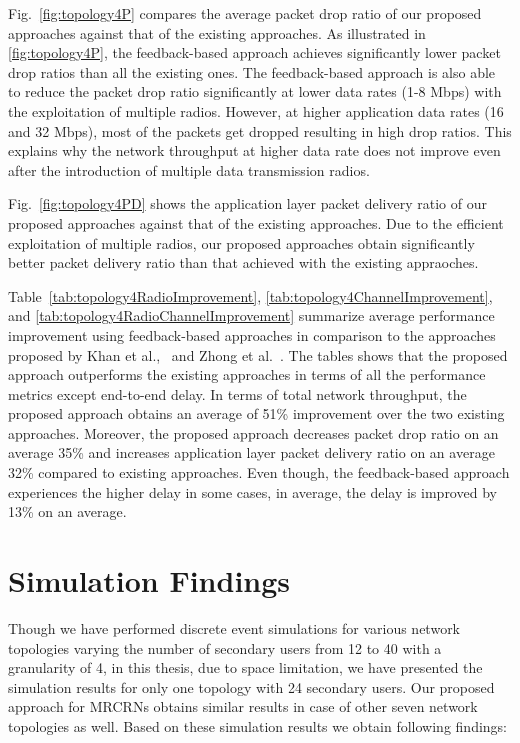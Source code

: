 Fig.~\ref{fig:topology4P} compares the average packet drop ratio of our proposed approaches against that of the existing approaches.  As illustrated in \cref{fig:topology4P}, the feedback-based approach achieves significantly lower packet drop ratios than all the existing ones. The feedback-based approach is also able to reduce the packet drop ratio significantly at lower data rates (1-8 Mbps) with the exploitation of multiple radios. However, at higher application data rates (16 and 32 Mbps), most of the packets get dropped resulting in high drop ratios. This explains why the network throughput at higher data rate does not improve even after the introduction of multiple data transmission radios.

Fig.~\ref{fig:topology4PD} shows the application layer packet delivery ratio of our proposed approaches against that of the existing approaches. Due to the efficient exploitation of multiple radios, our proposed approaches obtain significantly better packet delivery ratio than that achieved with the existing appraoches.

Table~\ref{tab:topology4RadioImprovement}, \ref{tab:topology4ChannelImprovement}, and \ref{tab:topology4RadioChannelImprovement} summarize average performance improvement using feedback-based approaches in comparison to the approaches proposed by Khan et al.,~\cite{khan2015towards} and Zhong et al.~\cite{zhong2014capacity}. The tables shows that the proposed approach outperforms the existing approaches in terms of all the performance metrics except end-to-end delay. In terms of total network throughput, the proposed approach obtains an average of 51\% improvement over the two existing approaches. Moreover, the proposed approach decreases packet drop ratio on an average 35\% and increases application layer packet delivery ratio on an average 32\% compared to existing approaches. Even though, the feedback-based approach experiences the higher delay in some cases, in average, the delay is improved by 13\% on an average.
%



\section{Simulation Findings}

Though we have performed discrete event simulations for various network topologies varying the number of secondary users from 12 to 40 with a granularity of 4, in this thesis, due to space limitation, we have presented the simulation results for only one topology with 24 secondary users. Our proposed approach for MRCRNs obtains similar results in case of other seven network topologies as well. Based on these simulation results we obtain following findings:

